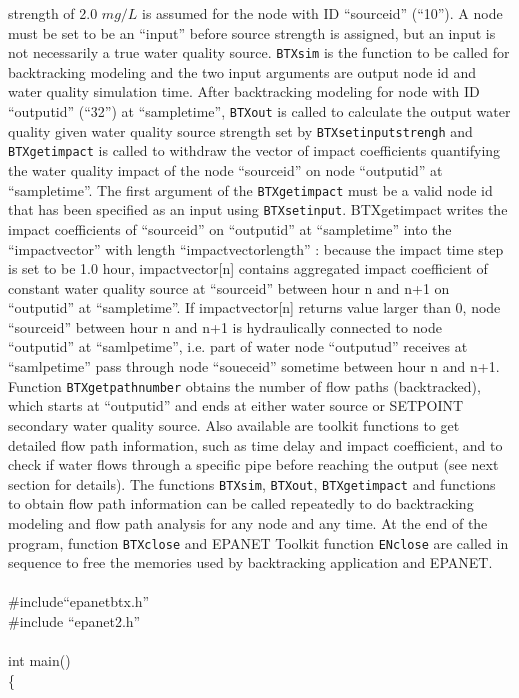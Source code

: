 \documentclass[12pt,letterpaper]{article}
\begin{document}
strength of 2.0 $mg/L$ is assumed for the node with ID ``sourceid''
(``10''). A node must be set to be an ``input'' before source
strength is assigned, but an input is not necessarily a true water
quality source. \texttt{BTXsim} is the function to be called for
backtracking modeling and the two input arguments are output node id
and water quality simulation time. After backtracking modeling for
node with ID ``outputid'' (``32'') at ``sampletime'',
\texttt{BTXout} is called to calculate the output water quality
given water quality source strength set by
\texttt{BTXsetinputstrengh} and \texttt{BTXgetimpact} is called to
withdraw the vector of impact coefficients quantifying the water
quality impact of the node ``sourceid'' on node ``outputid'' at
``sampletime''. The first argument of the \texttt{BTXgetimpact} must
be a valid node id that has been specified as an input using
\texttt{BTXsetinput}. BTXgetimpact writes the impact coefficients of
``sourceid'' on ``outputid'' at ``sampletime'' into the
``impactvector'' with length ``impactvectorlength'' : because the
impact time step is set to be 1.0 hour, impactvector[n] contains
aggregated impact coefficient of constant water quality source at
``sourceid'' between hour n and n+1 on ``outputid'' at
``sampletime''. If impactvector[n] returns value larger than 0, node
``sourceid'' between hour n and n+1 is hydraulically connected to
node ``outputid'' at ``samlpetime'', i.e. part of water node
``outputud'' receives at ``samlpetime'' pass through node
``soueceid'' sometime between hour n and n+1. Function
\texttt{BTXgetpathnumber} obtains the number of flow paths
(backtracked), which starts at ``outputid'' and ends at either water
source or SETPOINT secondary water quality source. Also available
are toolkit functions to get detailed flow path information, such as
time delay and impact coefficient, and to check if water flows
through a specific pipe before reaching the output (see next section
for details). The functions \texttt{BTXsim}, \texttt{BTXout},
\texttt{BTXgetimpact} and functions to obtain flow path information
can be called repeatedly to do backtracking modeling and flow path
analysis for any node and any time. At the end of the program,
function \texttt{BTXclose} and EPANET Toolkit function
\texttt{ENclose} are called in sequence to free the memories used by
backtracking application and EPANET.
\\\\
\#include``epanetbtx.h''\\\#include ``epanet2.h''\\\\int main()\\\{\\
\end{document}
